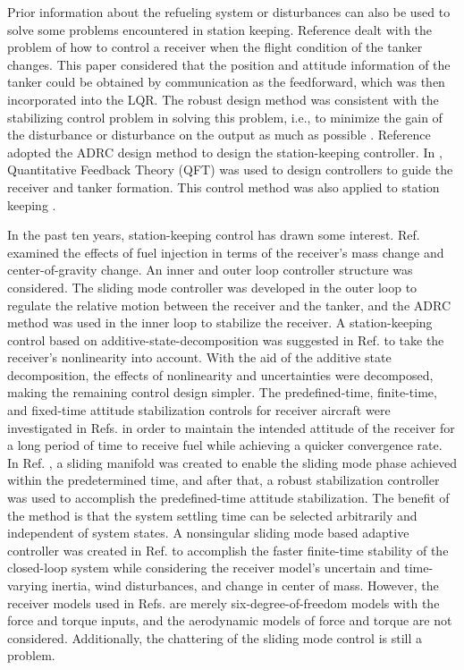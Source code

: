 Prior information about the refueling system or disturbances can also
be used to solve some problems encountered in station keeping. Reference
\cite{elliott2009improving} dealt with the problem of how to control
a receiver when the flight condition of the tanker changes. This paper
considered that the position and attitude information of the tanker
could be obtained by communication as the feedforward, which was then
incorporated into the LQR. The robust design method was consistent
with the stabilizing control problem in solving this problem, i.e.,
to minimize the gain of the disturbance or disturbance on the output
as much as possible \cite{rehan2012robust}. Reference \cite{sun2013uav}
adopted the ADRC design method to design the station-keeping controller.
In \cite{pachter1997design}, Quantitative Feedback Theory (QFT) was
used to design controllers to guide the receiver and tanker formation.
This control method was also applied to station keeping \cite{guo2010design}.

In the past ten years, station-keeping control has drawn some interest.
Ref.\cite{an2018relative} examined the effects of fuel injection
in terms of the receiver's mass change and center-of-gravity change.
An inner and outer loop controller structure was considered. The sliding
mode controller was developed in the outer loop to regulate the relative
motion between the receiver and the tanker, and the ADRC method was
used in the inner loop to stabilize the receiver. A station-keeping
control based on additive-state-decomposition was suggested in Ref.\cite{ren2021additive}
to take the receiver's nonlinearity into account. With the aid of
the additive state decomposition, the effects of nonlinearity and
uncertainties were decomposed, making the remaining control design
simpler. The predefined-time, finite-time, and fixed-time attitude
stabilization controls for receiver aircraft were investigated in
Refs.\cite{wu2021dynamic,wu2021predefined,wu2022predefined} in order
to maintain the intended attitude of the receiver for a long period
of time to receive fuel while achieving a quicker convergence rate.
In Ref.\cite{wu2021predefined} , a sliding manifold was created to
enable the sliding mode phase achieved within the predetermined time,
and after that, a robust stabilization controller was used to accomplish
the predefined-time attitude stabilization. The benefit of the method
is that the system settling time can be selected arbitrarily and independent
of system states. A nonsingular sliding mode based adaptive controller
was created in Ref.\cite{wu2021dynamic} to accomplish the faster
finite-time stability of the closed-loop system while considering
the receiver model's uncertain and time-varying inertia, wind disturbances,
and change in center of mass. However, the receiver models used in
Refs.\cite{wu2021dynamic,wu2021predefined,wu2022predefined} are merely
six-degree-of-freedom models with the force and torque inputs, and
the aerodynamic models of force and torque are not considered. Additionally,
the chattering of the sliding mode control is still a problem.

